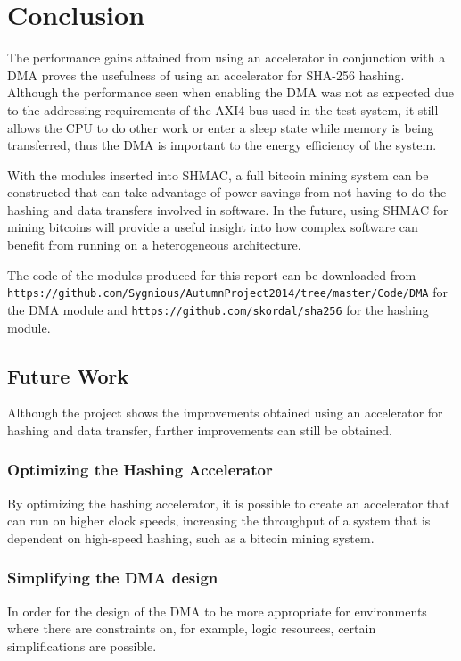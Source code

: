 \chapter{Conclusion}
\label{cha:conclusion}

The performance gains attained from using an accelerator in conjunction with a DMA
proves the usefulness of using an accelerator for SHA-256 hashing. Although the
performance seen when enabling the DMA was not as expected due to the addressing
requirements of the AXI4 bus used in the test system, it still allows the CPU to
do other work or enter a sleep state while memory is being transferred, thus
the DMA is important to the energy efficiency of the system.

With the modules inserted into SHMAC, a full bitcoin mining system can be
constructed that can take advantage of power savings from not having to do
the hashing and data transfers involved in software. In the future, using
SHMAC for mining bitcoins will provide a useful insight
into how complex software can benefit from running on a heterogeneous
architecture.

The code of the modules produced for this report can be downloaded from
\texttt{https://github.com/Sygnious/AutumnProject2014/tree/master/Code/DMA}
for the DMA module and \texttt{https://github.com/skordal/sha256} for
the hashing module.

\section{Future Work}
\label{sec:future-work}

Although the project shows the improvements obtained using an accelerator
for hashing and data transfer, further improvements can still be obtained.

\subsection{Optimizing the Hashing Accelerator}
By optimizing the hashing accelerator, it is possible to create an accelerator
that can run on higher clock speeds, increasing the throughput of a system that
is dependent on high-speed hashing, such as a bitcoin mining system.

\subsection{Simplifying the DMA design} 
In order for the design of the DMA to be more appropriate for environments where
there are constraints on, for example, logic resources, certain simplifications
are possible.

